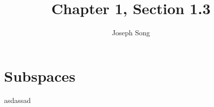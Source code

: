 \documentclass{article}
\title{Chapter 1, Section 1.3}
\author{Joseph Song}
\date{}
\begin{document}
\maketitle

\section{Subspaces}

asdassad
\end{document}
